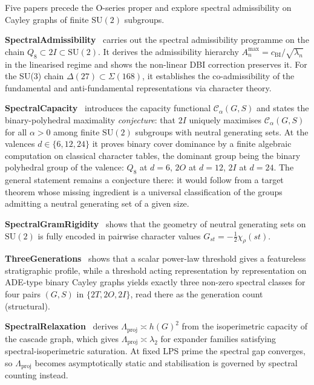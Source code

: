 \documentclass[11pt,a4paper]{article}
\theoremstyle{definition}
\newcommand{\SU}{\mathrm{SU}}
\newcommand{\cchi}{c_{\mathrm{BI}}}
\begin{document}
      Five papers precede the O-series proper and explore spectral admissibility on Cayley graphs
      of finite $\SU(2)$ subgroups.

      \textbf{SpectralAdmissibility}~\cite{Beau2026a1} carries out the spectral admissibility
      programme on the chain $Q_8 \subset 2I \subset \SU(2)$.
      It derives the admissibility hierarchy $A^{\max}_n = \cchi/\sqrt{\lambda_n}$ in the
      linearised regime and shows the non-linear DBI correction preserves it.
      For the SU(3) chain $\Delta(27) \subset \Sigma(168)$, it establishes the co-admissibility
      of the fundamental and anti-fundamental representations via character theory.

      \textbf{SpectralCapacity}~\cite{Beau2026a2} introduces the capacity functional
      $\mathcal{C}_\alpha(G, S)$ and states the binary-polyhedral maximality \emph{conjecture}:
      that $2I$ uniquely maximises $\mathcal{C}_\alpha(G, S)$ for all $\alpha > 0$ among finite
      $\SU(2)$ subgroups with neutral generating sets.
      At the valences $d \in \{6, 12, 24\}$ it proves binary cover dominance by a finite algebraic
      computation on classical character tables, the dominant group being the binary polyhedral
      group of the valence: $Q_8$ at $d = 6$, $2O$ at $d = 12$, $2I$ at $d = 24$.
      The general statement remains a conjecture there: it would follow from a target theorem
      whose missing ingredient is a universal classification of the groups admitting a neutral
      generating set of a given size.

      \textbf{SpectralGramRigidity}~\cite{Beau2026a3} shows that the geometry of neutral
      generating sets on $\SU(2)$ is fully encoded in pairwise character values
      $G_{st} = -\tfrac{1}{2}\chi_\rho(st)$.

      \textbf{ThreeGenerations}~\cite{Beau2026a4} shows that a scalar power-law threshold gives a
      featureless stratigraphic profile, while a threshold acting representation by representation
      on ADE-type binary Cayley graphs yields exactly three non-zero spectral classes for four
      pairs $(G, S)$ in $\{2T, 2O, 2I\}$, read there as the generation count (structural).

      \textbf{SpectralRelaxation}~\cite{Beau2026a5} derives
      $\Lambda_{\mathrm{proj}} \asymp h(G)^2$ from the isoperimetric capacity of the cascade
      graph, which gives $\Lambda_{\mathrm{proj}} \asymp \lambda_2$ for expander families
      satisfying spectral-isoperimetric saturation.
      At fixed LPS prime the spectral gap converges, so $\Lambda_{\mathrm{proj}}$ becomes
      asymptotically static and stabilisation is governed by spectral counting instead.
\end{document}
